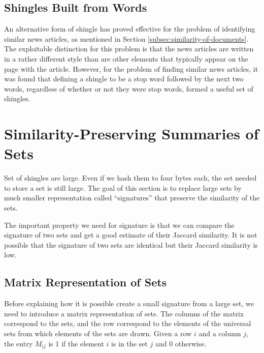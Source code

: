\subsection{Shingles Built from Words}\label{subsec:shingles-built-from-words}

An alternative form of shingle has proved effective for the problem of identifying similar news articles, as mentioned in Section \ref{subsec:similarity-of-documents}. The exploitable distinction for this problem is that the news articles are written in a rather different style than are other elements that typically appear on the page with the article. However, for the problem of finding similar news articles, it was found that defining a shingle to be a stop word followed by the next two words, regardless of whether or not they were stop words, formed a useful set of shingles. 

\section{Similarity-Preserving Summaries of Sets}\label{sec:similarity-preserving-summaries-of-sets}

Set of shingles are large. Even if we hash them to four bytes each, the set needed to store a set is still large. The goal of this section is to replace large sets by much smaller representation called ``signatures'' that preserve the similarity of the sets.

The important property we need for signature is that we can compare the signature of two sets and get a good estimate of their Jaccard similarity. It is not possible that the signature of two sets are identical but their Jaccard similarity is low.

\subsection{Matrix Representation of Sets}\label{subsec:matrix-representation-of-sets}

Before explaining how it is possible create a small signature from a large set, we need to introduce a matrix representation of sets. The columns of the matrix correspond to the sets, and the row correspond to the elements of the universal sets from which elements of the sets are drawn.
Given a row $i$ and a column $j$, the entry $M_{ij}$ is 1 if the element $i$ is in the set $j$ and 0 otherwise.

